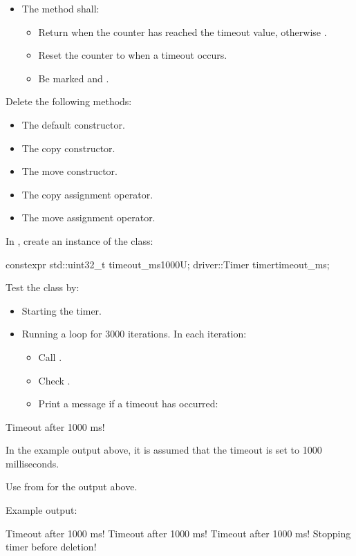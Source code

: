 \begin{parts}
\begin{itemize}
\begin{itemize}
      \item Increment the counter if the timer is running; otherwise do nothing.
      \item Return no value.
      \item Be marked .
    \end{itemize}
    \item The method  shall:
    \begin{itemize}
      \item Return  when the counter has reached the timeout value, otherwise
        .
      \item Reset the counter to  when a timeout occurs.
      \item Be marked  and \code{[[nodiscard]]}.
    \end{itemize}
  \end{itemize}
  \item Delete the following methods:
  \begin{itemize}
    \item The default constructor.
    \item The copy constructor.
    \item The move constructor.
    \item The copy assignment operator.
    \item The move assignment operator.
  \end{itemize}
  \item In , create an instance of the class:
\begin{cppcode}
constexpr std::uint32_t timeout_ms{1000U};
driver::Timer timer{timeout_ms};
\end{cppcode}
  Test the class by:
  \begin{itemize}
    \item Starting the timer.
    \item Running a loop for 3000 iterations. In each iteration:
    \begin{itemize}
      \item Call .
      \item Check .
      \item Print a message if a timeout has occurred:
    \end{itemize}
  \end{itemize}
\begin{console}
Timeout after 1000 ms!
\end{console}
  \note In the example output above, it is assumed that the timeout is set to 1000 milliseconds.

  Use  from  for the output above.
\end{parts}
Example output:

\begin{console}
Timeout after 1000 ms!
Timeout after 1000 ms!
Timeout after 1000 ms!
Stopping timer before deletion!
\end{console}
